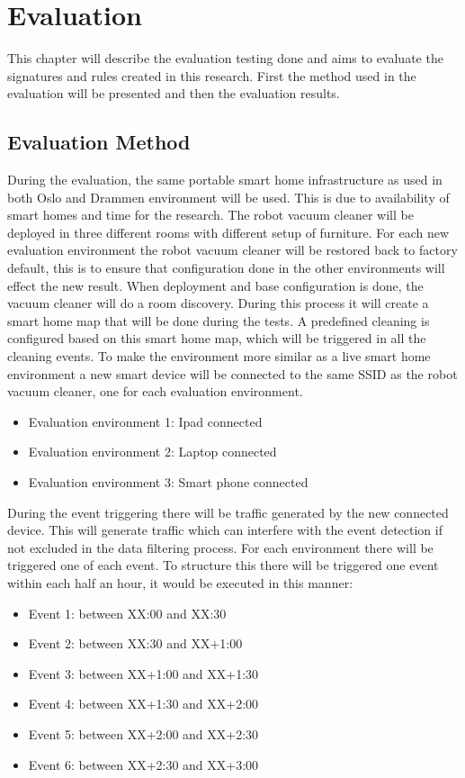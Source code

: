 \chapter{Evaluation}
\label{cap:Evaluation}
This chapter will describe the evaluation testing done and aims to evaluate the signatures and rules created in this research. First the method used in the evaluation will be presented and then the evaluation results. 

\section{Evaluation Method}
During the evaluation, the same portable smart home infrastructure as used in both  Oslo and Drammen environment will be used. This is due to availability of smart homes and time for the research. The robot vacuum cleaner will be deployed in three different rooms with different setup of furniture. For each new evaluation environment the robot vacuum cleaner will be restored back to factory default, this is to ensure that configuration done in the other environments will effect the new result. 
When deployment and base configuration is done, the vacuum cleaner will do a room discovery. During this process it will create a smart home map that will be done during the tests. A predefined cleaning is configured based on this smart home map, which will be triggered in all the cleaning events. 
To make the environment more similar as a live smart home environment a new smart device will be connected to the same SSID as the robot vacuum cleaner, one for each evaluation environment. 

\begin{itemize}
    \item Evaluation environment 1: Ipad connected
    \item Evaluation environment 2: Laptop connected
    \item Evaluation environment 3: Smart phone connected
\end{itemize}

During the event triggering there will be traffic generated by the new connected device. This will generate traffic which can interfere with the event detection if not excluded in the data filtering process. 
For each environment there will be triggered one of each event. To structure this there will be triggered one event within each half an hour, it would be executed in this manner: 

\begin{itemize}
    \item Event 1: between XX:00 and XX:30
    \item Event 2: between XX:30 and XX+1:00
    \item Event 3: between XX+1:00 and XX+1:30
    \item Event 4: between XX+1:30 and XX+2:00
    \item Event 5: between XX+2:00 and XX+2:30
    \item Event 6: between XX+2:30 and XX+3:00
\end{itemize}

